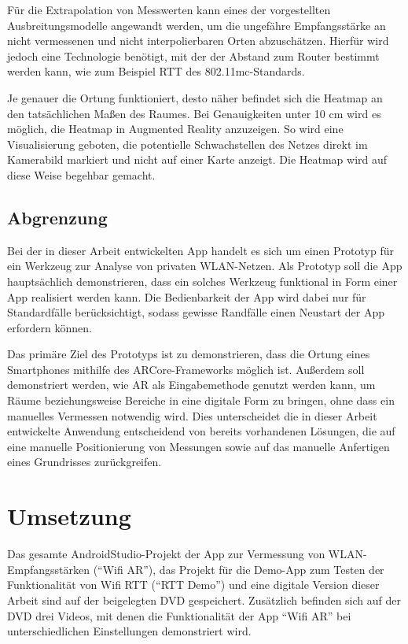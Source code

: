 \documentclass[10pt]{scrartcl}
\begin{document}
Für die Extrapolation von Messwerten kann eines der vorgestellten Ausbreitungsmodelle angewandt werden, um die ungefähre Empfangsstärke an nicht vermessenen und nicht interpolierbaren Orten abzuschätzen. Hierfür wird jedoch eine Technologie benötigt, mit der der Abstand zum Router bestimmt werden kann, wie zum Beispiel RTT des 802.11mc-Standards.

Je genauer die Ortung funktioniert, desto näher befindet sich die Heatmap an den tatsächlichen Maßen des Raumes. Bei Genauigkeiten unter 10 cm wird es möglich, die Heatmap in Augmented Reality anzuzeigen. So wird eine Visualisierung geboten, die potentielle Schwachstellen des Netzes direkt im Kamerabild markiert und nicht auf einer Karte anzeigt. Die Heatmap wird auf diese Weise begehbar gemacht.

\subsection{Abgrenzung}
Bei der in dieser Arbeit entwickelten App handelt es sich um einen Prototyp für ein Werkzeug zur Analyse von privaten WLAN-Netzen. Als Prototyp soll die App hauptsächlich demonstrieren, dass ein solches Werkzeug funktional in Form einer App realisiert werden kann. Die Bedienbarkeit der App wird dabei nur für Standardfälle berücksichtigt, sodass gewisse Randfälle einen Neustart der App erfordern können.

Das primäre Ziel des Prototyps ist zu demonstrieren, dass die Ortung eines Smartphones mithilfe des ARCore-Frameworks möglich ist. Außerdem soll demonstriert werden, wie AR als Eingabemethode genutzt werden kann, um Räume beziehungsweise Bereiche in eine digitale Form zu bringen, ohne dass ein manuelles Vermessen notwendig wird. Dies unterscheidet die in dieser Arbeit entwickelte Anwendung entscheidend von bereits vorhandenen Lösungen, die auf eine manuelle Positionierung von Messungen sowie auf das manuelle Anfertigen eines Grundrisses zurückgreifen.

\newpage

\section{Umsetzung}
Das gesamte AndroidStudio-Projekt der App zur Vermessung von WLAN-Empfangsstärken (\enquote{Wifi AR}), das Projekt für die Demo-App zum Testen der Funktionalität von Wifi RTT (\enquote{RTT Demo}) und eine digitale Version dieser Arbeit sind auf der beigelegten DVD gespeichert. Zusätzlich befinden sich auf der DVD drei Videos, mit denen die Funktionalität der App \enquote{Wifi AR} bei unterschiedlichen Einstellungen demonstriert wird.
\end{document}
